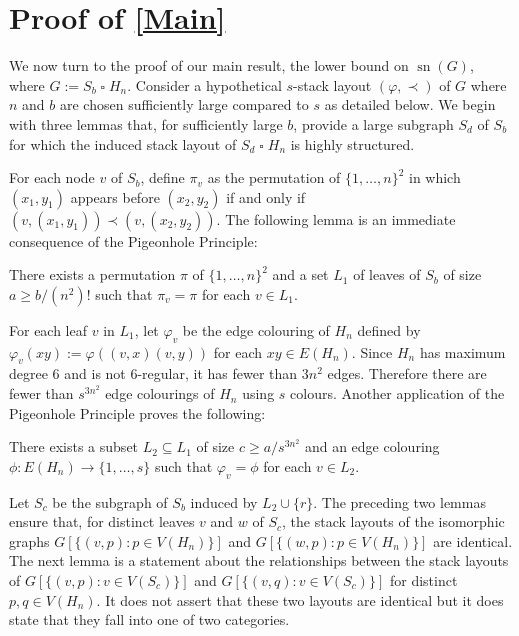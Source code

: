 \documentclass[kpfonts]{patmorin}
\DeclareMathOperator{\sn}{sn}
\renewcommand{\ge}{\geqslant}
\newcommand{\CartProd}{\mathbin{\square}}
\begin{document}
\section{Proof of \cref{Main}}

We now turn to the proof of our main result, the lower bound on $\sn(G)$, where $G:= S_b\CartProd H_n$. Consider a hypothetical $s$-stack layout $(\varphi,\prec)$ of $G$ where $n$ and $b$ are chosen sufficiently large compared to $s$ as detailed below. We begin with three lemmas that, for sufficiently large $b$, provide a large subgraph $S_d$ of $S_b$ for which the induced stack layout of $S_d\CartProd H_n$ is highly structured.

For each node $v$ of $S_b$, define $\pi_v$ as the permutation of $\{1,\ldots,n\}^2$ in which $(x_1,y_1)$ appears before $(x_2,y_2)$ if and only if $(v,(x_1,y_1))\prec (v,(x_2,y_2))$. The following lemma is an immediate consequence of the Pigeonhole Principle:

\begin{lem}\label{uniform_order}
    There exists a permutation $\pi$ of $\{1,\ldots,n\}^2$ and a set $L_1$ of leaves of $S_b$ of size $a\ge b/(n^2)!$ such that $\pi_{v}=\pi$ for each $v\in L_1$.
\end{lem}

For each leaf $v$ in $L_1$, let $\varphi_v$ be the edge colouring of $H_n$ defined by $\varphi_v(xy):=\varphi((v,x)(v,y))$ for each $xy\in E(H_n)$. Since $H_n$ has maximum degree $6$ and is not 6-regular, it has fewer than $3n^2$ edges.  Therefore there are fewer than $s^{3n^2}$ edge colourings of $H_n$ using $s$ colours.  Another application of the Pigeonhole Principle proves the following:

\begin{lem}\label{uniform_colour}
    There exists a subset $L_2\subseteq L_1$ of size $c\ge a/s^{3n^2}$
    and an edge colouring $\phi:E(H_n)\to\{1,\ldots,s\}$ such that $\varphi_v=\phi$ for each $v\in L_2$.
\end{lem}


Let $S_{c}$ be the subgraph of $S_b$ induced by $L_2\cup\{r\}$. The preceding two lemmas ensure that, for distinct leaves $v$ and $w$ of $S_{c}$, the stack layouts of the isomorphic graphs $G[\{(v,p):p\in V(H_n)\}]$ and $G[\{(w,p):p\in V(H_n)\}]$ are identical. The next lemma is a statement about the relationships between the stack layouts of $G[\{(v,p):v\in V(S_{c})\}]$ and $G[\{(v,q):v\in V(S_{c})\}]$ for  distinct $p,q\in V(H_n)$.  It does not assert that these two layouts are identical but it does state that they fall into one of two categories.
\end{document}

